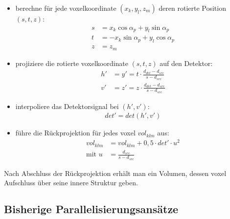 \begin{itemize}
    \item berechne für jede \gls{voxel}koordinate $(x_k, y_l, z_m)$ deren rotierte Position $(s, t, z)$:
        \begin{equation}
            \begin{aligned}
                s &= x_k \cos \alpha_p + y_l \sin \alpha_p\\
                t &= -x_k \sin \alpha_p + y_l \cos \alpha_p\\
                z &= z_m
            \end{aligned}
        \end{equation}

    \item projiziere die rotierte \gls{voxel}koordinate $(s, t, z)$ auf den Detektor:
        \begin{equation}
            \begin{aligned}
                h' &= y' = t \cdot \frac{d_{det} - d_{src}}{s - d_{src}}\\
                v' &= z' = z \cdot \frac{d_{det} - d_{src}}{s - d_{src}}
            \end{aligned}
        \end{equation}

    \item interpoliere das Detektorsignal bei $(h', v')$:
        \begin{equation}
            \begin{aligned}
                det' = det(h', v')
            \end{aligned}
        \end{equation}

    \item führe die Rückprojektion für jedes \gls{voxel} $vol_{klm}$ aus:
        \begin{equation}
            \begin{aligned}
                vol_{klm} &= vol_{klm} + 0,5 \cdot det' \cdot u^2\\
                \text{mit } u &= \frac{d_{src}}{s - d_{src}}
            \end{aligned}
        \end{equation}
\end{itemize}

Nach Abschluss der Rückprojektion erhält man ein Volumen, dessen \gls{voxel} Aufschluss über seine innere Struktur
geben.

\subsection{Bisherige Parallelisierungsansätze}\label{ssec:par}


